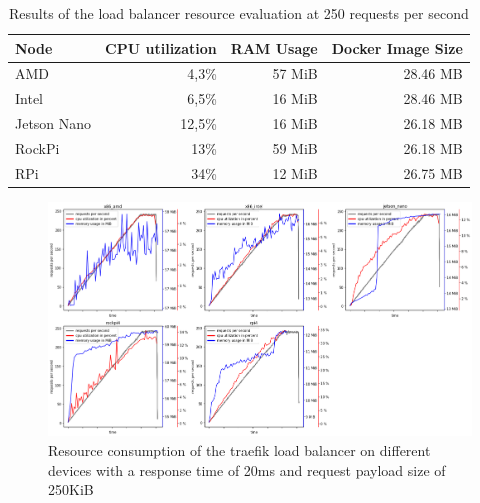 \documentclass[draft,final]{vutinfth} %
\begin{document}
\begin{table}[]
\begin{tabular}{lrrr}
\hline
\textbf{Node} & \textbf{CPU utilization} & \textbf{RAM Usage} & \textbf{Docker Image Size} \\ \hline
AMD           & 4,3\%                    & 57 MiB             & 28.46 MB                   \\
Intel         & 6,5\%                    & 16 MiB             & 28.46 MB                   \\
Jetson Nano   & 12,5\%                   & 16 MiB             & 26.18 MB                   \\
RockPi        & 13\%                     & 59 MiB             & 26.18 MB                   \\
RPi           & 34\%                     & 12 MiB             & 26.75 MB                  
\end{tabular}
\caption{Results of the load balancer resource evaluation at 250 requests per second}
\label{tab:resource_eval_results}
\end{table}
\begin{figure}
    \centering
    \includegraphics[width=14cm]{graphics/graphs/lb_resources_by_device.png}
    \caption{Resource consumption of the traefik\cite{traefik} load balancer on different devices with a response time of 20ms and request payload size of 250KiB}
    \label{fig:lb_resources_by_type}
\end{figure}
\end{document}
